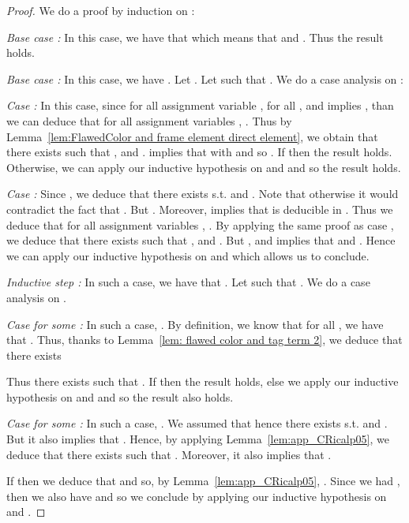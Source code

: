 \begin{proof}
We do a proof by induction on :

\medskip

\noindent\emph{Base case :} In this case, we have that  which means that  and . Thus the result holds. 

\medskip

\noindent\emph{Base case :} In this case, we have . Let . Let  such that . We do a case analysis on :

\emph{Case :} In this case, since for all assignment variable , for all ,  and  implies , than we can deduce that for all assignment variables , . Thus by Lemma~\ref{lem:FlawedColor and frame element direct element}, we obtain that there exists  such that ,  and .  implies that  with  and so . If  then the result holds. Otherwise, we can apply our inductive hypothesis on  and  and so the result holds.
 
 \emph{Case  :} Since , we deduce that there exists  s.t.  and . Note that  otherwise it would contradict the fact that . But . Moreover,  implies that  is deducible in . Thus we deduce that for all assignment variables , . By applying the same proof as case , we deduce that there exists  such that ,  and . But ,  and  implies that  and . Hence we can apply our inductive hypothesis on  and  which allows us to conclude.

\medskip

 \noindent \emph{Inductive step :} In such a case, we have that . Let  such that . We do a case analysis on .

\smallskip{}

 \emph{Case  for some :} In such a  case, . By definition, we know that for all , we have that . Thus, thanks to Lemma~\ref{lem: flawed color and tag term 2}, we 
 deduce that there exists 
 
Thus there exists  such that . If  then the result holds, else we apply our inductive hypothesis on  and  and so the result also holds.

\smallskip{}

 \emph{Case  for some :} In such a  case, . We assumed that  hence there exists  s.t.  and . But it also implies that . Hence, by applying Lemma~\ref{lem:app_CRicalp05}, we deduce that there exists  such that . Moreover, it also implies that . 
 
 If  then we deduce that  and so, by Lemma~\ref{lem:app_CRicalp05}, . Since we had , then we also have  and so we conclude by applying our inductive hypothesis on  and .
 

\end{proof}
